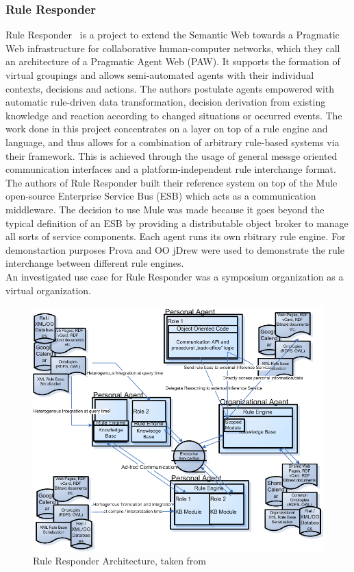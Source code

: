 \documentclass[11pt]{article}%
\begin{document}
\subsubsection{Rule Responder}
Rule Responder~\cite{2007-Paschke_etal-RuleResponder.pdf} is a project to extend the Semantic Web towards a Pragmatic Web infrastructure for collaborative human-computer networks, which they call an architecture of a Pragmatic Agent Web (PAW). It supports the formation of virtual groupings and allows semi-automated agents with their individual contexts, decisions and actions. The authors postulate agents empowered with automatic rule-driven data transformation, decision derivation from existing knowledge and reaction according to changed situations or occurred events. The work done in this project concentrates on a layer on top of a rule engine and language, and thus allows for a combination of arbitrary rule-based systems via their framework. This is achieved through the usage of general messge oriented communication interfaces and a platform-independent rule interchange format.
\\
The authors of Rule Responder built their reference system on top of the Mule~\cite{wwwmuleesb} open-source Enterprise Service Bus (ESB) which acts as a communication middleware. The decision to use Mule was made because it goes beyond the typical definition of an ESB by providing a distributable object broker to manage all sorts of service components. Each agent runs its own rbitrary rule engine. For demonstartion purposes Prova and OO jDrew were used to demonstrate the rule interchange between different rule engines.
\\
An investigated use case for Rule Responder was a symposium organization as a virtual organization.

\begin{figure}[htb]
\begin{center}
\includegraphics[scale=0.4]{img_rr01}
\caption{Rule Responder Architecture, taken from \cite{2007-Paschke_etal-RuleResponder.pdf}}
\end{center}
\end{figure}
\end{document}
